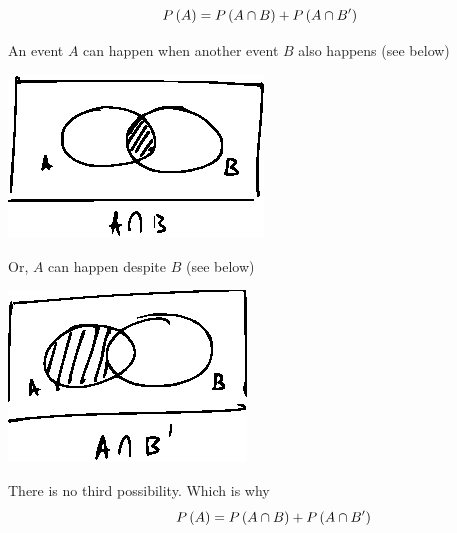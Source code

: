 \documentclass[14pt,fleqn]{extarticle}
\begin{document}
 
\begin{snippet}
    \correct
    
    \[ P\left( A\right) = P\left( A\cap B\right) + P\left( A\cap B'\right) \]
    
    \reason
    
    An event $A$ can happen when another event $B$ also happens (see below) 
    \begin{center}
\includegraphics[scale=1.4]{97-A.eps}
\end{center}

Or, $A$ can happen despite $B$ (see below) 
\begin{center}
\includegraphics[scale=1.4]{97-B.eps}
\end{center}

There is no third possibility. Which is why 
\[ \qquad P\left( A\right) = P\left( A\cap B\right) + P\left( A\cap B'\right) \]
\end{snippet} 
\end{document}
